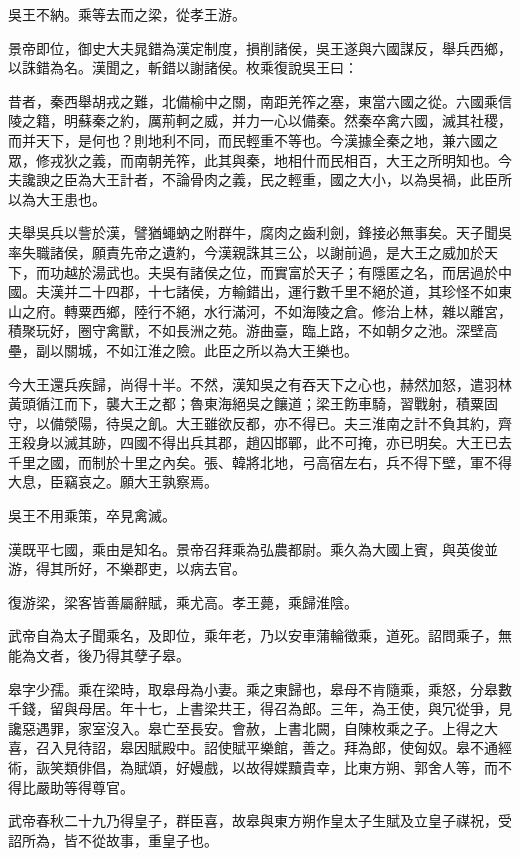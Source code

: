 \begin{pinyinscope}
吳王不納。乘等去而之梁，從孝王游。

景帝即位，御史大夫晁錯為漢定制度，損削諸侯，吳王遂與六國謀反，舉兵西鄉，以誅錯為名。漢聞之，斬錯以謝諸侯。枚乘復說吳王曰：

昔者，秦西舉胡戎之難，北備榆中之關，南距羌筰之塞，東當六國之從。六國乘信陵之籍，明蘇秦之約，厲荊軻之威，并力一心以備秦。然秦卒禽六國，滅其社稷，而并天下，是何也？則地利不同，而民輕重不等也。今漢據全秦之地，兼六國之眾，修戎狄之義，而南朝羌筰，此其與秦，地相什而民相百，大王之所明知也。今夫讒諛之臣為大王計者，不論骨肉之義，民之輕重，國之大小，以為吳禍，此臣所以為大王患也。

夫舉吳兵以訾於漢，譬猶蠅蚋之附群牛，腐肉之齒利劍，鋒接必無事矣。天子聞吳率失職諸侯，願責先帝之遺約，今漢親誅其三公，以謝前過，是大王之威加於天下，而功越於湯武也。夫吳有諸侯之位，而實富於天子；有隱匿之名，而居過於中國。夫漢并二十四郡，十七諸侯，方輸錯出，運行數千里不絕於道，其珍怪不如東山之府。轉粟西鄉，陸行不絕，水行滿河，不如海陵之倉。修治上林，雜以離宮，積聚玩好，圈守禽獸，不如長洲之苑。游曲臺，臨上路，不如朝夕之池。深壁高壘，副以關城，不如江淮之險。此臣之所以為大王樂也。

今大王還兵疾歸，尚得十半。不然，漢知吳之有吞天下之心也，赫然加怒，遣羽林黃頭循江而下，襲大王之都；魯東海絕吳之饟道；梁王飭車騎，習戰射，積粟固守，以備滎陽，待吳之飢。大王雖欲反都，亦不得已。夫三淮南之計不負其約，齊王殺身以滅其跡，四國不得出兵其郡，趙囚邯鄲，此不可掩，亦已明矣。大王已去千里之國，而制於十里之內矣。張、韓將北地，弓高宿左右，兵不得下壁，軍不得大息，臣竊哀之。願大王孰察焉。

吳王不用乘策，卒見禽滅。

漢既平七國，乘由是知名。景帝召拜乘為弘農都尉。乘久為大國上賓，與英俊並游，得其所好，不樂郡吏，以病去官。

復游梁，梁客皆善屬辭賦，乘尤高。孝王薨，乘歸淮陰。

武帝自為太子聞乘名，及即位，乘年老，乃以安車蒲輪徵乘，道死。詔問乘子，無能為文者，後乃得其孽子皋。

皋字少孺。乘在梁時，取皋母為小妻。乘之東歸也，皋母不肯隨乘，乘怒，分皋數千錢，留與母居。年十七，上書梁共王，得召為郎。三年，為王使，與冗從爭，見讒惡遇罪，家室沒入。皋亡至長安。會赦，上書北闕，自陳枚乘之子。上得之大喜，召入見待詔，皋因賦殿中。詔使賦平樂館，善之。拜為郎，使匈奴。皋不通經術，詼笑類俳倡，為賦頌，好嫚戲，以故得媟黷貴幸，比東方朔、郭舍人等，而不得比嚴助等得尊官。

武帝春秋二十九乃得皇子，群臣喜，故皋與東方朔作皇太子生賦及立皇子禖祝，受詔所為，皆不從故事，重皇子也。


\end{pinyinscope}
